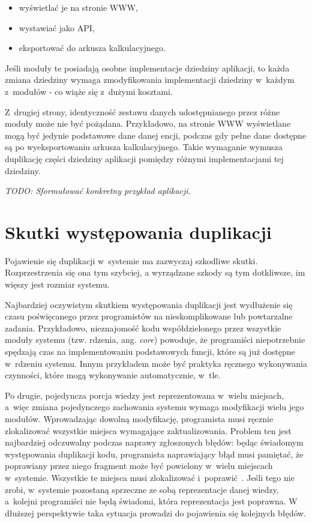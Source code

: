 \begin{itemize}
 \item wyświetlać je na stronie WWW,
 \item wystawiać jako API,
 \item eksportować do arkusza kalkulacyjnego.
\end{itemize}

Jeśli moduły te posiadają osobne implementacje dziedziny aplikacji, to każda zmiana dziedziny wymaga zmodyfikowania implementacji dziedziny w~każdym z~modułów - co wiąże się z~dużymi kosztami.

Z~drugiej strony, identyczność zestawu danych udostępnianego przez różne moduły może nie być pożądana.
Przykładowo, na stronie WWW wyświetlane mogą być jedynie podstawowe dane danej encji, podczas gdy pełne dane dostępne są po wyeksportowaniu arkusza kalkulacyjnego.
Takie wymaganie wymusza duplikację części dziedziny aplikacji pomiędzy różnymi implementacjami tej dziedziny.


\emph{TODO: Sformułować konkretny przykład aplikacji.}



\section{Skutki występowania duplikacji}

Pojawienie się duplikacji w~systemie ma zazwyczaj szkodliwe skutki.
Rozprzestrzenia się ona tym szybciej, a wyrządzane szkody są tym dotkliwsze, im więszy jest rozmiar systemu.

Najbardziej oczywistym skutkiem występowania duplikacji jest wydłużenie się czasu poświęcanego przez programistów na nieskomplikowane lub powtarzalne zadania.
Przykładowo, nieznajomość kodu współdzielonego przez wszystkie moduły systemu (tzw. rdzenia, ang. \emph{core}) powoduje, że programiści niepotrzebnie spędzają czas na implementowaniu podstawowych funcji, które są już dostępne w~rdzeniu systemu.
Innym przykładem może być praktyka ręcznego wykonywania czynności, które mogą wykonywanie automatycznie, w~tle.

Po drugie, pojedyncza porcja wiedzy jest reprezentowana w~wielu miejsach, a~więc zmiana pojedynczego zachowania systemu wymaga modyfikacji wielu jego modułów.
Wprowadzając dowolną modyfikację, programista musi ręcznie zlokalizować wszystkie miejsca wymagające zaktualizowania.
Problem ten jest najbardziej odczuwalny podczas naprawy zgłoszonych błędów: będąc świadomym występowania duplikacji kodu, programista naprawiający błąd musi pamiętać, że poprawiany przez niego fragment może być powielony w~wielu miejscach w~systemie.
Wszystkie te miejsca musi zlokalizować i~poprawić~\cite{repetition}.
Jeśli tego nie zrobi, w~systemie pozostaną sprzeczne ze sobą reprezentacje danej wiedzy, a~kolejni programiści nie będą świadomi, która reprezentacja jest poprawna.
W dłuższej perspektywie taka sytuacja prowadzi do pojawienia się kolejnych błędów.

